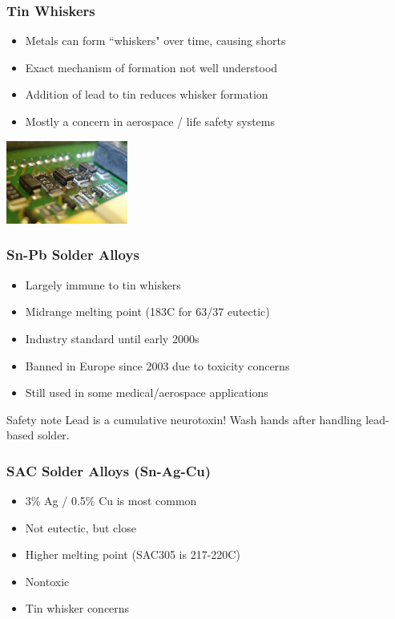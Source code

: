 \documentclass{beamer}
\begin{document}
\begin{frame}
\frametitle{Tin Whiskers}
\begin{itemize}
\item Metals can form ``whiskers" over time, causing shorts
\item Exact mechanism of formation not well understood
\item Addition of lead to tin reduces whisker formation
\item Mostly a concern in aerospace / life safety systems
\end{itemize}
\begin{center}
\includegraphics[width=4cm,keepaspectratio]{whiskers.jpg}
\end{center}
\end{frame}

\begin{frame}
\frametitle{Sn-Pb Solder Alloys}
\begin{itemize}
\item Largely immune to tin whiskers
\item Midrange melting point (183C for 63/37 eutectic)
\item Industry standard until early 2000s
\item Banned in Europe since 2003 due to toxicity concerns
\item Still used in some medical/aerospace applications
\end{itemize}
\begin{alertblock}{Safety note}
Lead is a cumulative neurotoxin! Wash hands after handling lead-based solder.
\end{alertblock}
\end{frame}

\begin{frame}
\frametitle{SAC Solder Alloys (Sn-Ag-Cu)}
\begin{itemize}
\item 3\% Ag / 0.5\% Cu is most common
\item Not eutectic, but close
\item Higher melting point (SAC305 is 217-220C)
\item Nontoxic
\item Tin whisker concerns
\end{itemize}
\end{frame}
\end{document}
